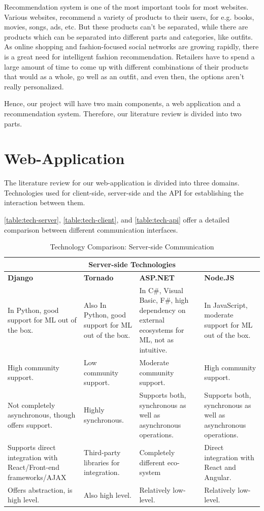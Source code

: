 
Recommendation system is one of the most important tools for most websites. Various websites, recommend a variety of products to their users, for e.g. books, movies, songs, ads, etc. But these products can’t be separated, while there are products which can be separated into different parts and categories, like outfits. As online shopping and fashion-focused social networks are growing rapidly, there is a great need for intelligent fashion recommendation. Retailers have to spend a large amount of time to come up with different combinations of their products that would as a whole, go well as an outfit, and even then, the options aren’t really personalized. \newline

Hence, our project will have two main components, a web application and a recommendation system. Therefore, our literature review is divided into two parts.

\section{Web-Application}
The literature review for our web-application is divided into three domains. Technologies used for client-side, server-side and the API for establishing the interaction between them. \newline

 \autoref{table:tech-server}, \autoref{table:tech-client}, and \autoref{table:tech-api} offer a detailed comparison between different communication interfaces.
 
\begin{table}[H]
\begin{tabular}{ @{}|p{4cm}|p{3cm}|p{4cm}|p{3cm}|  }
 \hline
 \multicolumn{4}{|c|}{\textbf{Server-side Technologies}} \\
 \hline
 \textbf{Django} & \textbf{Tornado} & \textbf{ASP.NET} & \textbf{Node.JS}\\
 \hline
 In Python, good support for ML out of the box.   & Also In Python, good support for ML out of the box.    & In C\#, Visual Basic, F\#, high dependency on external ecosystems for ML, not as intuitive. & In JavaScript, moderate support for ML out of the box.\\
  \hline
 High community support.&   Low community support.  & Moderate community support. & High community support.\\
  \hline
Not completely asynchronous, though offers support. &  Highly synchronous. & Supports both, synchronous as well as asynchronous operations. & Supports both, synchronous as well as asynchronous operations. \\
  \hline
Supports direct integration with React/Front-end frameworks/AJAX & Third-party libraries for integration. & Completely different eco-system & Direct integration with React and Angular.\\
 \hline
 Offers abstraction, is high level. & Also high level.  & Relatively low-level. & Relatively low-level.\\
 \hline
\end{tabular}
\caption{Technology Comparison: Server-side Communication}
\label{table:tech-server}
\end{table}

